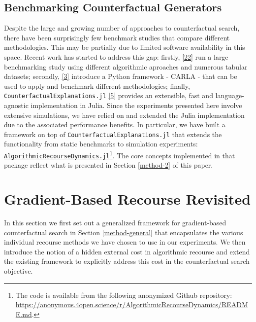\documentclass[conference,final,]{IEEEtran}
\theoremstyle{definition}
\theoremstyle{definition}
\theoremstyle{definition}
\theoremstyle{definition}
\theoremstyle{remark}
\begin{document}
\hypertarget{related-benchmark}{%
\subsection{Benchmarking Counterfactual Generators}\label{related-benchmark}}

Despite the large and growing number of approaches to counterfactual search, there have been surprisingly few benchmark studies that compare different methodologies. This may be partially due to limited software availability in this space. Recent work has started to address this gap: firstly, \protect\hyperlink{ref-de2021framework}{{[}22{]}} run a large benchmarking study using different algorithmic aproaches and numerous tabular datasets; secondly, \protect\hyperlink{ref-pawelczyk2021carla}{{[}3{]}} introduce a Python framework - CARLA - that can be used to apply and benchmark different methodologies; finally, \texttt{CounterfactualExplanations.jl} \protect\hyperlink{ref-altmeyer2022CounterfactualExplanations}{{[}5{]}} provides an extensible, fast and language-agnostic implementation in Julia. Since the experiments presented here involve extensive simulations, we have relied on and extended the Julia implementation due to the associated performance benefits. In particular, we have built a framework on top of \texttt{CounterfactualExplanations.jl} that extends the functionality from static benchmarks to simulation experiments: \href{(https://anonymous.4open.science/r/AlgorithmicRecourseDynamics/README.md)}{\texttt{AlgorithmicRecourseDynamics.jl}}\footnote{The code is available from the following anonymized Github repository: \url{https://anonymous.4open.science/r/AlgorithmicRecourseDynamics/README.md}.}. The core concepts implemented in that package reflect what is presented in Section \ref{method-2} of this paper.

\hypertarget{method}{%
\section{Gradient-Based Recourse Revisited}\label{method}}

In this section we first set out a generalized framework for gradient-based counterfactual search in Section \ref{method-general} that encapsulates the various individual recourse methods we have chosen to use in our experiments. We then introduce the notion of a hidden external cost in algorithmic recourse and extend the existing framework to explicitly address this cost in the counterfactual search objective.
\end{document}

